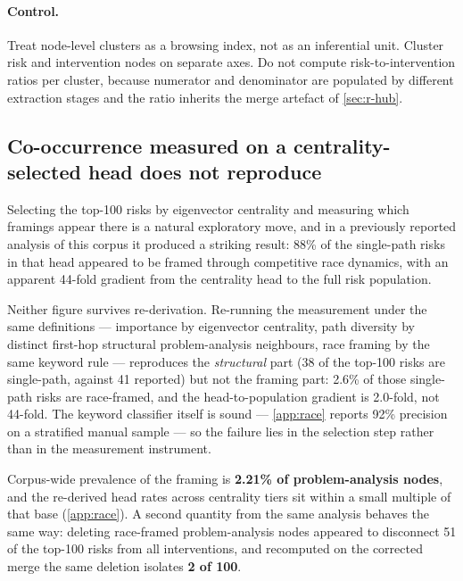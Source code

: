 \documentclass[10pt,twocolumn,letterpaper]{article}
\begin{document}
\paragraph{Control.} Treat node-level clusters as a browsing index, not as an
inferential unit. Cluster risk and intervention nodes on separate axes. Do not compute
risk-to-intervention ratios per cluster, because numerator and denominator are populated
by different extraction stages and the ratio inherits the merge artefact of
\cref{sec:r-hub}.

\subsection{Co-occurrence measured on a centrality-selected head does not reproduce}
\label{sec:r-selection}

Selecting the top-100 risks by eigenvector centrality and measuring which framings appear
there is a natural exploratory move, and in a previously reported analysis of this corpus
it produced a striking result: 88\% of the single-path risks in that head appeared to be
framed through competitive race dynamics, with an apparent 44-fold gradient from the
centrality head to the full risk population.

Neither figure survives re-derivation. Re-running the measurement under the same
definitions --- importance by eigenvector centrality, path diversity by distinct
first-hop structural problem-analysis neighbours, race framing by the same keyword rule
--- reproduces the \emph{structural} part (38 of the top-100 risks are single-path,
against 41 reported) but not the framing part: 2.6\% of those single-path risks are
race-framed, and the head-to-population gradient is 2.0-fold, not 44-fold. The keyword
classifier itself is sound --- \cref{app:race} reports 92\% precision on a stratified
manual sample --- so the failure lies in the selection step rather than in the
measurement instrument.

Corpus-wide prevalence of the framing is \textbf{2.21\% of problem-analysis nodes}, and
the re-derived head rates across centrality tiers sit within a small multiple of that
base (\cref{app:race}). A second quantity from the same analysis behaves the same way:
deleting race-framed problem-analysis nodes appeared to disconnect 51 of the top-100
risks from all interventions, and recomputed on the corrected merge the same deletion
isolates \textbf{2 of 100}.
\end{document}

